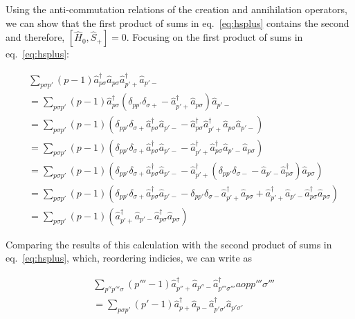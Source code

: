 \documentclass[11pt]{article}
\newcommand{\cop}[2]{%
	\ensuremath{ \hat{a} _{#1 #2} ^{\dagger} }}
\newcommand{\aop}[2]{%
	\ensuremath{ \hat{a} _{#1 #2} }}
\newcommand{\sop}[1]{%
	\ensuremath{ \hat{S}_{#1} } }
\newcommand{\krondelt}[2]{%
	\ensuremath{ \delta _{#1 #2} }}
\newcommand{\hop}{
	\ensuremath{ \hat{H} _0 }}
\newcommand{\commutator}[2]{%
	\ensuremath{ \left [ #1,#2 \right ] }}
\begin{document}
Using the anti-commutation relations of the creation and annihilation operators, we can show that the first product of sums in eq.~\ref{eq:hsplus} contains the second and therefore, $ \commutator{\hop}{\sop{+}} =0$. Focusing on the first product of sums in eq.~\ref{eq:hsplus}:

\begin{align}
	& \sum_{p \sigma p'} (p-1) \cop{p}{\sigma} \aop{p}{\sigma} \cop{p'}{+} \aop{p'}{-}\\
	&= \sum_{p \sigma p'} (p-1) \cop{p}{\sigma} \left (\krondelt{p}{p'} \krondelt{\sigma}{+} -  \cop{p'}{+} \aop{p}{\sigma} \right ) \aop{p'}{-}\\
	&= \sum_{p \sigma p'} (p-1) \left ( \krondelt{p}{p'} \krondelt{\sigma}{+} \cop{p}{\sigma} \aop{p'}{-} - \cop{p}{\sigma}  \cop{p'}{+} \aop{p}{\sigma} \aop{p'}{-} \right )\\
	&= \sum_{p \sigma p'} (p-1) \left ( \krondelt{p}{p'} \krondelt{\sigma}{+} \cop{p}{\sigma} \aop{p'}{-} - \cop{p'}{+} \cop{p}{\sigma} \aop{p'}{-} \aop{p}{\sigma} \right )\\
	&= \sum_{p \sigma p'} (p-1) \left ( \krondelt{p}{p'} \krondelt{\sigma}{+} \cop{p}{\sigma} \aop{p'}{-} - \cop{p'}{+} \left ( \krondelt{p}{p'} \krondelt{\sigma}{-} - \aop{p'}{-} \cop{p}{\sigma} \right ) \aop{p}{\sigma} \right )\\
	&= \sum_{p \sigma p'} (p-1) \left ( \krondelt{p}{p'} \krondelt{\sigma}{+} \cop{p}{\sigma} \aop{p'}{-} - \krondelt{p}{p'} \krondelt{\sigma}{-} \cop{p'}{+} \aop{p}{\sigma} + \cop{p'}{+} \aop{p'}{-} \cop{p}{\sigma} \aop{p}{\sigma} \right )\\
	&= \sum_{p \sigma p'} (p-1) \left ( \cop{p'}{+} \aop{p'}{-} \cop{p}{\sigma} \aop{p}{\sigma} \right )
\end{align}

Comparing the results of this calculation with the second product of sums in eq.~\ref{eq:hsplus}, which, reordering indicies, we can write as

\begin{align*}
	& \sum_{p'' p''' \sigma} (p''' -1) \cop{p''}{+} \aop{p''}{-}\cop{p'''}{\sigma'''}aop{p'''}{\sigma'''}\\
	&= \sum_{p \sigma p' } (p' -1) \cop{p}{+} \aop{p}{-} \cop{p'}{\sigma'} \aop{p'}{\sigma'}
\end{align*}
\end{document}
